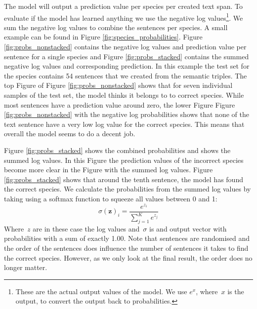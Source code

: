 \documentclass[a4paper, 12pt, oneside]{book} %
\begin{document}
The model will output a prediction value per species per created text span.
To evaluate if the model has learned anything we use the negative log values\footnote{These are the actual output values of the model. We use \(e^{x}\), where~$x$ is the output, to convert the output back to probabilities. }. 
We sum the negative log values to combine the sentences per species. 
A small example can be found in Figure \ref{fig:species_probabilities}.
Figure \ref{fig:probs_nonstacked} contains the negative log values and prediction value per sentence for a single species and Figure \ref{fig:probs_stacked} contains the summed negative log values and corresponding prediction.
In this example the test set for the species contains 54 sentences that we created from the semantic triples.
The top Figure of Figure \ref{fig:probs_nonstacked} shows that for seven individual samples of the test set, the model thinks it belongs to to correct species. 
While most sentences have a prediction value around zero, the lower Figure Figure \ref{fig:probs_nonstacked} with the negative log probabilities shows that none of the text sentence have a very low log value for the correct species.
This means that overall the model seems to do a decent job.

Figure \ref{fig:probs_stacked} shows the combined probabilities and shows the summed log values.
In this Figure the prediction values of the incorrect species become more clear in the Figure with the summed log values.
Figure \ref{fig:probs_stacked} shows that around the tenth sentence, the model has found the correct species.
We calculate the probabilities from the summed log values by taking using a softmax function to squeeze all values between 0 and 1:
\begin{equation} \label{eq:softmax}
    \sigma(\mathbf{z})_i = \frac{e^{z_i}}{\sum_{j=1}^K e^{z_j}}
\end{equation}
Where~$z$ are in these case the log values and~$\sigma$ is and output vector with probabilities with a sum of exactly 1.00.
Note that sentences are randomised and the order of the sentences does influence the number of sentences it takes to find the correct species.
However, as we only look at the final result, the order does no longer matter.
\end{document}
